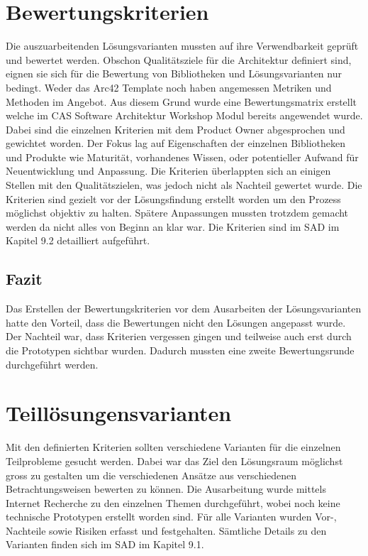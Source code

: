 \section{Bewertungskriterien}

Die auszuarbeitenden Lösungsvarianten mussten auf ihre Verwendbarkeit geprüft und bewertet werden. Obschon Qualitätsziele für die Architektur definiert sind, eignen sie sich für die Bewertung von Bibliotheken und Lösungsvarianten nur bedingt. Weder das Arc42 Template noch \cite{esa} haben angemessen Metriken und Methoden im Angebot. Aus diesem Grund wurde eine Bewertungsmatrix erstellt welche im CAS Software Architektur Workshop Modul bereits angewendet wurde. Dabei sind die einzelnen Kriterien mit dem Product Owner abgesprochen und gewichtet worden. Der Fokus lag auf Eigenschaften der einzelnen Bibliotheken und Produkte wie Maturität, vorhandenes Wissen, oder potentieller Aufwand für Neuentwicklung und Anpassung. Die Kriterien überlappten sich an einigen Stellen mit den Qualitätszielen, was jedoch nicht als Nachteil gewertet wurde. Die Kriterien sind gezielt vor der Lösungsfindung erstellt worden um den Prozess möglichst objektiv zu halten. Spätere Anpassungen mussten trotzdem gemacht werden da nicht alles von Beginn an klar war. Die Kriterien sind im SAD im Kapitel 9.2 detailliert aufgeführt.

\subsection{Fazit}

Das Erstellen der Bewertungskriterien vor dem Ausarbeiten der Lösungsvarianten hatte den Vorteil, dass die Bewertungen nicht den Lösungen angepasst wurde. Der Nachteil war, dass Kriterien vergessen gingen und teilweise auch erst durch die Prototypen sichtbar wurden. Dadurch mussten eine zweite Bewertungsrunde durchgeführt werden.


\section{Teillösungensvarianten}

Mit den definierten Kriterien sollten verschiedene Varianten für die einzelnen Teilprobleme gesucht werden. Dabei war das Ziel den Lösungsraum möglichst gross zu gestalten um die verschiedenen Ansätze aus verschiedenen Betrachtungsweisen bewerten zu können. Die Ausarbeitung wurde mittels Internet Recherche zu den einzelnen Themen durchgeführt, wobei noch keine technische Prototypen erstellt worden sind. Für alle Varianten wurden Vor-, Nachteile sowie Risiken erfasst und festgehalten. Sämtliche Details zu den Varianten finden sich im SAD im Kapitel 9.1.

